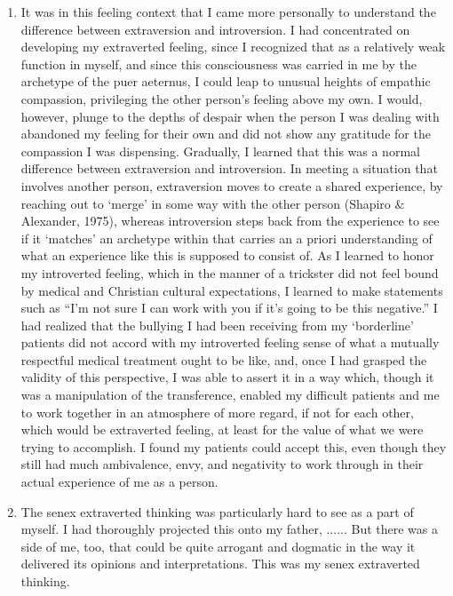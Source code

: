 \begin{enumerate}
    \item {} It was in this feeling context that I
        came more personally to understand the difference between extraversion
        and introversion. I had concentrated on developing my extraverted
        feeling, since I recognized that as a relatively weak function in
        myself, and since this consciousness was carried in me by the archetype
        of the puer aeternus, I could leap to unusual heights of empathic
        compassion, privileging the other person’s feeling above my own. I
        would, however, plunge to the depths of despair when the person I was
        dealing with abandoned my feeling for their own and did not show any
        gratitude for the compassion I was dispensing. Gradually, I learned
        that this was a normal difference between extraversion and
        introversion. In meeting a situation that involves another person,
        extraversion moves to create a shared experience, by reaching out to
        ‘merge’ in some way with the other person (Shapiro \& Alexander, 1975),
        whereas introversion steps back from the experience to see if it
        ‘matches’ an archetype within that carries an a priori understanding of
        what an experience like this is supposed to consist of. As I learned to
        honor my introverted feeling, which in the manner of a trickster did
        not feel bound by medical and Christian cultural expectations, I
        learned to make statements such as “I’m not sure I can work with you if
        it’s going to be this negative.” I had realized that the bullying I had
        been receiving from my ‘borderline’ patients did not accord with my
        introverted feeling sense of what a mutually respectful medical
        treatment ought to be like, and, once I had grasped the validity of
        this perspective, I was able to assert it in a way which, though it was
        a manipulation of the transference, enabled my difficult patients and
        me to work together in an atmosphere of more regard, if not for each
        other, which would be extraverted feeling, at least for the value of
        what we were trying to accomplish. I found my patients could accept
        this, even though they still had much ambivalence, envy, and negativity
        to work through in their actual experience of me as a person.

    \item {} The senex extraverted thinking was particularly
        hard to see as a part of myself. I had thoroughly projected this onto
        my father, ...... But there was a side of me, too, that could be quite
        arrogant and dogmatic in the way it delivered its opinions and
        interpretations. This was my senex extraverted thinking.


\end{enumerate}
